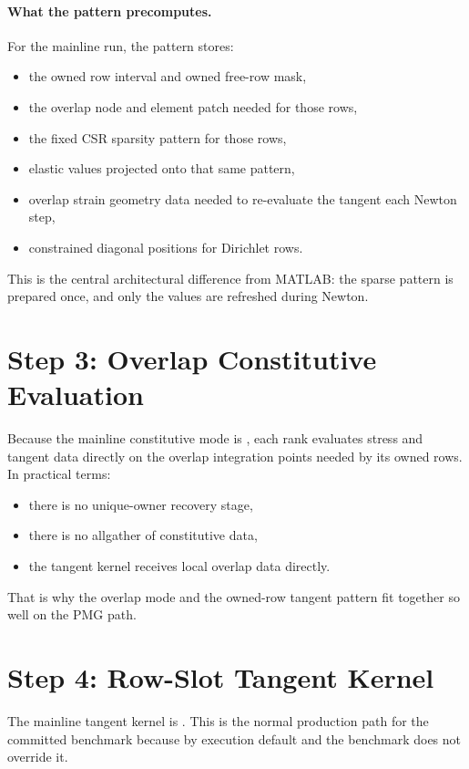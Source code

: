 \paragraph{What the pattern precomputes.}
For the mainline run, the pattern stores:
\begin{itemize}
\item the owned row interval and owned free-row mask,
\item the overlap node and element patch needed for those rows,
\item the fixed CSR sparsity pattern for those rows,
\item elastic values projected onto that same pattern,
\item overlap strain geometry data needed to re-evaluate the tangent each
Newton step,
\item constrained diagonal positions for Dirichlet rows.
\end{itemize}

This is the central architectural difference from MATLAB: the sparse pattern is
prepared once, and only the values are refreshed during Newton.

\section{Step 3: Overlap Constitutive Evaluation}

Because the mainline constitutive mode is , each rank evaluates
stress and tangent data directly on the overlap integration points needed by its
owned rows. In practical terms:
\begin{itemize}
\item there is no unique-owner recovery stage,
\item there is no allgather of constitutive data,
\item the tangent kernel receives local overlap data directly.
\end{itemize}

That is why the overlap mode and the owned-row tangent pattern fit together so
well on the PMG path.

\section{Step 4: Row-Slot Tangent Kernel}

The mainline tangent kernel is . This is the normal production path
for the committed benchmark because  by execution
default and the benchmark does not override it.

